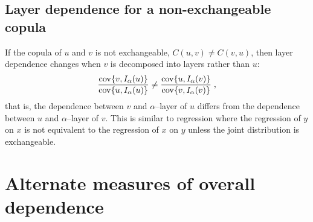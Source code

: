 \documentclass[authoryear]{elsarticle}
\newcommand{\cov}{{\rm cov}}
\newcommand{\eref}[1]{(\ref{#1})}
\begin{document}

\subsection{Layer dependence for a non-exchangeable copula}

If the copula of $u$ and $v$ is not exchangeable, $C(u,v)\neq C(v,u)$, then layer dependence changes when $v$ is decomposed into layers rather than $u$:
$$
\frac{\cov\{v,I_\alpha(u)\}}{\cov\{u,I_\alpha(u)\}}
\neq \frac{\cov\{u,I_\alpha(v)\}}{\cov\{v,I_\alpha(v)\}}  \;,
$$
that is, the dependence between $v$ and $\alpha$--layer of $u$ differs from the dependence between $u$ and $\alpha$--layer of $v$.
This is similar to  regression where the regression of $y$ on $x$ is  not equivalent to the regression of $x$ on $y$ unless the  joint distribution is  exchangeable.








\section{Alternate measures of overall dependence}\label{saltoverall}
\end{document}
